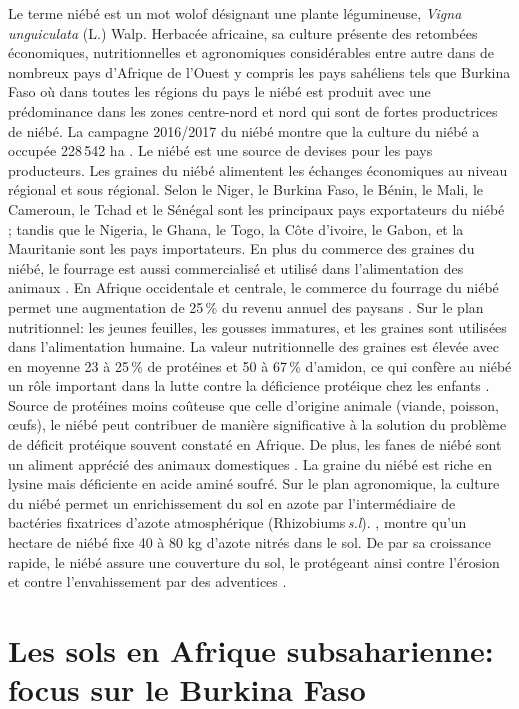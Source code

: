 \documentclass[a4paper,11pt]{article}
\begin{document}
Le terme niébé est un mot wolof désignant une plante légumineuse,
\emph{Vigna unguiculata} (L.) Walp. Herbacée africaine, sa culture
présente des retombées économiques, nutritionnelles et agronomiques
considérables entre autre dans de nombreux pays d'Afrique de l'Ouest y
compris les pays sahéliens tels que Burkina Faso où dans toutes les
régions du pays le niébé est produit avec une prédominance dans les
zones centre-nord et nord qui sont de fortes productrices de niébé. La
campagne 2016/2017 du niébé montre que la culture  du niébé a occupée
228\,542 ha \cite{DGESS_2017}. Le
niébé est une source de devises pour les pays producteurs. Les graines
du niébé alimentent les échanges économiques au niveau régional et
sous régional. Selon  le Niger, le Burkina
Faso, le Bénin, le Mali, le Cameroun, le Tchad et le Sénégal sont les
principaux pays exportateurs du niébé ; tandis que le Nigeria, le
Ghana, le Togo, la Côte d'ivoire, le Gabon, et la Mauritanie sont les
pays importateurs. En plus du commerce des graines du niébé, le
fourrage est aussi commercialisé et utilisé dans l'alimentation des
animaux \cite{Langyintuo_2003}. En Afrique occidentale et centrale, le
commerce du fourrage du niébé permet une augmentation de 25\,\% du
revenu annuel des paysans \cite{Quin_1997}. Sur le plan nutritionnel:
les jeunes feuilles, les gousses immatures, et les graines sont
utilisées dans l'alimentation humaine. La valeur nutritionnelle des
graines est élevée avec en moyenne 23 à 25\,\% de protéines et 50 à
67\,\% d'amidon, ce qui confère au niébé un rôle important dans la
lutte contre la déficience protéique chez les enfants
\cite{Quin_1997}. Source de protéines moins coûteuse que celle
d'origine animale (viande, poisson, œufs), le niébé peut contribuer de
manière significative à la solution du problème de déficit protéique
souvent constaté en Afrique. De plus, les fanes de niébé sont un
aliment apprécié des animaux domestiques \cite{BAMBARA_2008}. La
graine du niébé est riche en lysine mais déficiente en acide aminé
soufré. Sur le plan agronomique, la culture du niébé permet un
enrichissement du sol en azote par l'intermédiaire de bactéries
fixatrices d'azote atmosphérique
(Rhizobiums\,\emph{s.l}). , montre qu'un hectare de niébé
fixe 40 à 80 kg d'azote nitrés dans le sol. De par sa croissance
rapide, le niébé assure une couverture du sol, le protégeant ainsi
contre l'érosion et contre l'envahissement par des adventices
\cite{Sawadogo_2009}.

\section{Les sols en Afrique subsaharienne: focus sur le Burkina Faso}
\end{document}

